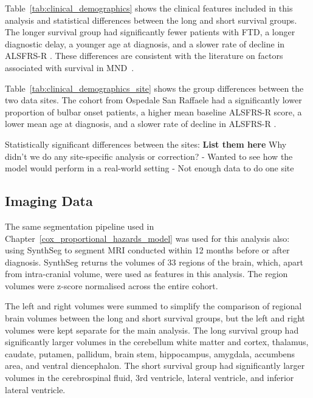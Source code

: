 Table~\ref{tab:clinical_demographics} shows the clinical features included in this analysis and statistical differences between the long and short survival groups.
The longer survival group had significantly fewer patients with FTD, a longer diagnostic delay, a younger age at diagnosis, and a slower rate of decline in ALSFRS-R .
These differences are consistent with the literature on factors associated with survival in MND~\cite{suPredictorsSurvivalPatients2021}.


Table~\ref{tab:clinical_demographics_site} shows the group differences between the two data sites.
The cohort from Ospedale San Raffaele had a significantly lower proportion of bulbar onset patients, a higher mean baseline ALSFRS-R score, a lower mean age at diagnosis, and a slower rate of decline in ALSFRS-R .

Statistically significant differences between the sites: \textbf{List them here}
Why didn't we do any site-specific analysis or correction?
- Wanted to see how the model would perform in a real-world setting
- Not enough data to do one site

\subsection{Imaging Data}
The same segmentation pipeline used in Chapter~\ref{cox_proportional_hazards_model} was used for this analysis also: using SynthSeg to segment MRI conducted within 12 months before or after diagnosis.
SynthSeg returns the volumes of 33 regions of the brain, which, apart from intra-cranial volume, were used as features in this analysis.
The region volumes were z-score normalised across the entire cohort.

The left and right volumes were summed to simplify the comparison of regional brain volumes between the long and short survival groups, but the left and right volumes were kept separate for the main analysis.
The long survival group had significantly larger volumes in the cerebellum white matter and cortex, thalamus, caudate, putamen, pallidum, brain stem, hippocampus, amygdala, accumbens area, and ventral diencephalon.
The short survival group had significantly larger volumes in the cerebrospinal fluid, 3rd ventricle, lateral ventricle, and inferior lateral ventricle.


